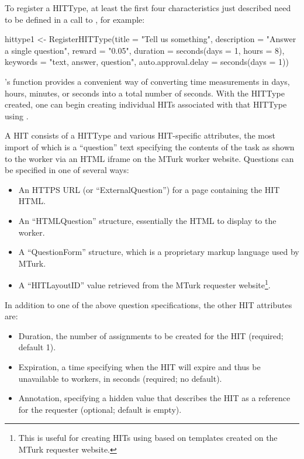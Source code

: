 To register a HITType, at least the first four characteristics just described need to be defined in a call to , for example:

\begin{example}
hittype1 <- RegisterHITType(title = "Tell us something", 
                            description = "Answer a single question", 
                            reward = "0.05", 
                            duration = seconds(days = 1, hours = 8), 
                            keywords = "text, answer, question", 
                            auto.approval.delay = seconds(days = 1))
\end{example}

's  function provides a convenient way of converting time measurements in days, hours, minutes, or seconds into a total number of seconds. With the HITType created, one can begin creating individual HITs associated with that HITType using .

A HIT consists of a HITType and various HIT-specific attributes, the most import of which is a ``question'' text specifying the contents of the task as shown to the worker via an HTML iframe on the MTurk worker website. Questions can be specified in one of several ways:

\begin{itemize}
	\item An HTTPS URL (or ``ExternalQuestion'') for a page containing the HIT HTML.
	\item An ``HTMLQuestion'' structure, essentially the HTML to display to the worker.
	\item A ``QuestionForm'' structure, which is a proprietary markup language used by MTurk.
	\item A ``HITLayoutID'' value retrieved from the MTurk requester website\footnote{This is useful for creating HITs using  based on templates created on the MTurk requester website.}.
\end{itemize}

\noindent In addition to one of the above question specifications, the other HIT attributes are:

\begin{itemize}
\item Duration, the number of assignments to be created for the HIT (required; default 1).
\item Expiration, a time specifying when the HIT will expire and thus be unavailable to workers, in seconds (required; no default).
\item Annotation, specifying a hidden value that describes the HIT as a reference for the requester (optional; default is empty).
\end{itemize}

